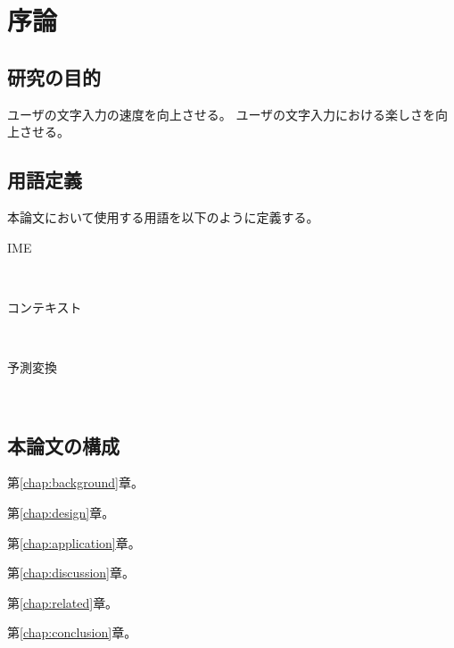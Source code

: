 \chapter{序論}
\label{chap:introduction}

\section{研究の目的}
ユーザの文字入力の速度を向上させる。
ユーザの文字入力における楽しさを向上させる。
\section{用語定義}

本論文において使用する用語を以下のように定義する。

\begin{description}
  \item [IME] \mbox{}\\
  \item [コンテキスト] \mbox{}\\
  \item [予測変換] \mbox{}\\

\end{description}

\section{本論文の構成}


第\ref{chap:background}章。

第\ref{chap:design}章。

第\ref{chap:application}章。

第\ref{chap:discussion}章。

第\ref{chap:related}章。

第\ref{chap:conclusion}章。
